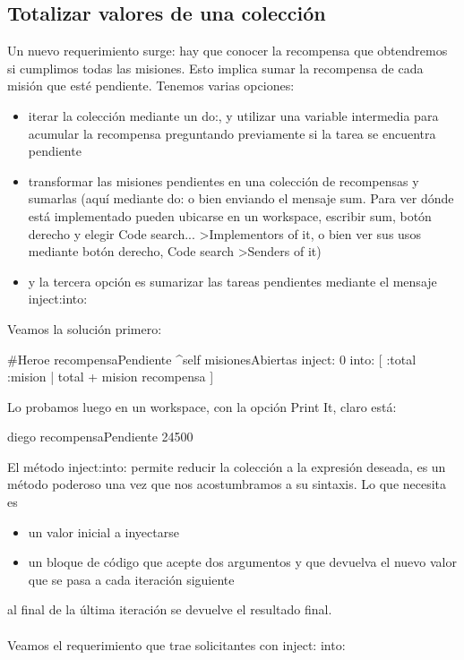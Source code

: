 \documentclass[a4paper,12pt]{book}
\begin{document}
\subsection{Totalizar valores de una colección}
Un nuevo requerimiento surge: hay que conocer la recompensa que obtendremos si cumplimos todas las misiones.
Esto implica sumar la recompensa de cada misión que esté pendiente. Tenemos varias opciones:
\\
\begin{itemize}
 \item iterar la colección mediante un do:, y utilizar una variable intermedia para acumular la recompensa
 preguntando previamente si la tarea se encuentra pendiente
 \item transformar las misiones pendientes en una colección de recompensas y sumarlas (aquí mediante do: o 
 bien enviando el mensaje sum. Para ver dónde está implementado pueden ubicarse en un workspace, escribir sum, 
 botón derecho y elegir Code search... \textgreater Implementors of it, o bien ver sus usos mediante botón derecho,
 Code search \textgreater Senders of it)
 \item y la tercera opción es sumarizar las tareas pendientes mediante el mensaje inject:into:
\end{itemize}

Veamos la solución primero:

\begin{code}
#Heroe
recompensaPendiente
   ^self misionesAbiertas 
         inject: 0 
	 into: [ :total :mision | total + mision recompensa ]
\end{code}

Lo probamos luego en un workspace, con la opción Print It, claro está:

\begin{code}
diego recompensaPendiente
  24500
\end{code}

El método inject:into: permite reducir la colección a la expresión deseada, es un método poderoso una vez que
nos acostumbramos a su sintaxis. Lo que necesita es

\begin{itemize}
 \item un valor inicial a inyectarse 
 \item un bloque de código que acepte dos argumentos y que devuelva el nuevo valor que se pasa a cada iteración siguiente
\end{itemize}

al final de la última iteración se devuelve el resultado final.
\\
\\
Veamos el requerimiento que trae solicitantes con inject: into:
\end{document}
